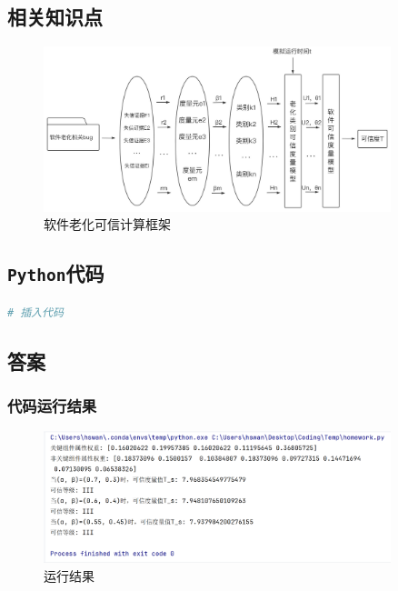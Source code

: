 \documentclass{article}
\begin{document}
\subsection{相关知识点}

\begin{figure}[H]
	\centering
	\includegraphics[width=0.9\textwidth]{img/static_3.png}
	\caption{软件老化可信计算框架}
\end{figure}

\subsection{\texttt{Python}代码}

\begin{lstlisting}[language=Python]
	# 插入代码
\end{lstlisting}

\subsection{答案}

\subsubsection{代码运行结果}

\begin{figure}[H]
	\centering
	\includegraphics[width=0.9\textwidth]{img/1.png}
	\caption{运行结果}
\end{figure}
\end{document}

